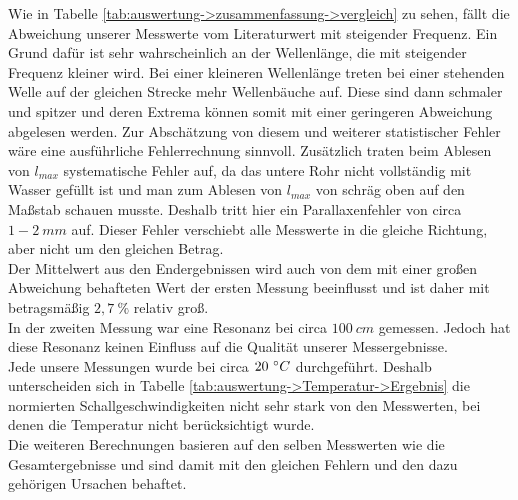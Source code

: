 Wie in Tabelle \ref{tab:auswertung->zusammenfassung->vergleich} zu sehen, fällt die Abweichung unserer Messwerte vom Literaturwert mit steigender Frequenz. Ein Grund dafür ist sehr wahrscheinlich an der Wellenlänge, die mit steigender Frequenz kleiner wird. %
Bei einer kleineren Wellenlänge treten bei einer stehenden Welle auf der gleichen Strecke mehr Wellenbäuche auf. Diese sind dann schmaler und spitzer und deren Extrema können somit mit einer geringeren Abweichung abgelesen werden. Zur Abschätzung von diesem und weiterer statistischer Fehler wäre eine ausführliche Fehlerrechnung sinnvoll.
Zusätzlich traten beim Ablesen von $l_{max}$ systematische Fehler auf, da das untere Rohr nicht vollständig mit Wasser gefüllt ist und man zum Ablesen von $l_{max}$ von schräg oben auf den Maßstab schauen musste. Deshalb tritt hier ein Parallaxenfehler von circa $1-2~mm$ auf. Dieser Fehler verschiebt alle Messwerte in die gleiche Richtung, aber nicht um den gleichen Betrag. \\
Der Mittelwert aus den Endergebnissen wird auch von dem mit einer großen Abweichung behafteten Wert der ersten Messung beeinflusst und ist daher mit betragsmäßig $2,7~\%$ relativ groß. \\[5pt]

In der zweiten Messung war eine Resonanz bei circa $100~cm$ gemessen. Jedoch hat diese Resonanz keinen Einfluss auf die Qualität unserer Messergebnisse.\\[5pt]

Jede unsere Messungen wurde bei circa $20~^\circ C$ durchgeführt. Deshalb unterscheiden sich in Tabelle \ref{tab:auswertung->Temperatur->Ergebnis} die normierten Schallgeschwindigkeiten nicht sehr stark von den Messwerten, bei denen die Temperatur nicht berücksichtigt wurde. \\[5pt]

Die weiteren Berechnungen basieren auf den selben Messwerten wie die Gesamtergebnisse und sind damit mit den gleichen Fehlern und den dazu gehörigen Ursachen behaftet.

